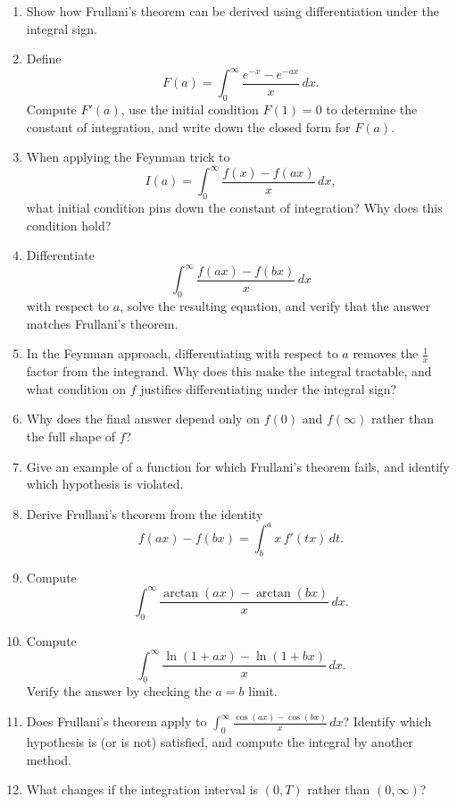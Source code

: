 \begin{enumerate}
  \item Show how Frullani's theorem can be derived using differentiation under the integral sign.
  \item Define
    \[
      F(a) = \int_0^\infty \frac{e^{-x} - e^{-ax}}{x}\,dx.
    \]
    Compute $F'(a)$, use the initial condition $F(1) = 0$ to determine the constant of integration, and write
    down the closed form for $F(a)$.
  \item When applying the Feynman trick to
    \[
      I(a) = \int_0^\infty \frac{f(x) - f(ax)}{x}\,dx,
    \]
    what initial condition pins down the constant of integration? Why does this condition hold?
  \item Differentiate
    \[
      \int_0^\infty \frac{f(ax) - f(bx)}{x}\,dx
    \]
    with respect to $a$, solve the resulting equation, and verify that the answer matches Frullani's theorem.
  \item In the Feynman approach, differentiating with respect to $a$ removes the $\tfrac{1}{x}$ factor from
    the integrand. Why does this make the integral tractable, and what condition on $f$ justifies
    differentiating under the integral sign?
  \item Why does the final answer depend only on $f(0)$ and $f(\infty)$ rather than the full shape of $f$?
  \item Give an example of a function for which Frullani's theorem fails, and identify which hypothesis is violated.


  \item Derive Frullani's theorem from the identity
    \[
      f(ax) - f(bx) = \int_b^a x\,f'(tx)\,dt.
    \]
  \item Compute
    \[
      \int_0^\infty \frac{\arctan(ax) - \arctan(bx)}{x}\,dx.
    \]
  \item Compute
    \[
      \int_0^\infty \frac{\ln(1+ax) - \ln(1+bx)}{x}\,dx.
    \]
    Verify the answer by checking the $a = b$ limit.
  \item Does Frullani's theorem apply to $\displaystyle\int_0^\infty \frac{\cos(ax) - \cos(bx)}{x}\,dx$?
    Identify which hypothesis is (or is not) satisfied, and compute the integral by another method.
  \item What changes if the integration interval is $(0,T)$ rather than $(0,\infty)$?



\end{enumerate}

